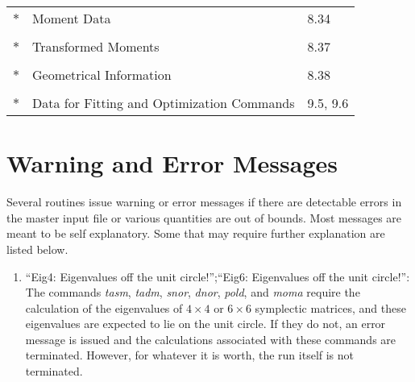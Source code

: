 \begin{center}
\begin{tabular}{cll}
           $\ast$    &       Moment Data &  8.34\\
\vspace{-3mm}& &\\
           $\ast$    &        Transformed Moments &  8.37\\
\vspace{-3mm}& &\\
           $\ast$    &        Geometrical Information &  8.38\\
\vspace{-3mm}& &\\
           $\ast$    &        Data for Fitting and Optimization Commands   &    9.5, 9.6
\end{tabular}
\end{center}

\newpage
\section{Warning and Error Messages}  
Several \Mary routines issue warning or error messages if there are detectable errors in the master input file or various quantities are out of bounds.  Most messages are meant to be self explanatory.  Some that may require further explanation are listed below.
\begin{enumerate}
\item ``Eig4: Eigenvalues off the unit circle!'';``Eig6: Eigenvalues off the unit
circle!'':  The commands {\em tasm}, {\em tadm}, {\em snor}, {\em dnor}, {\em pold}, and {\em moma} require the calculation of the eigenvalues of $4 \times 4$ or $6 \times 6$ symplectic matrices, and these eigenvalues are expected to lie on the unit circle.  If they do not, an error message is issued and the calculations associated with these commands are terminated.  However, for whatever it is worth, the \Mary run itself is not terminated.
\end{enumerate}



